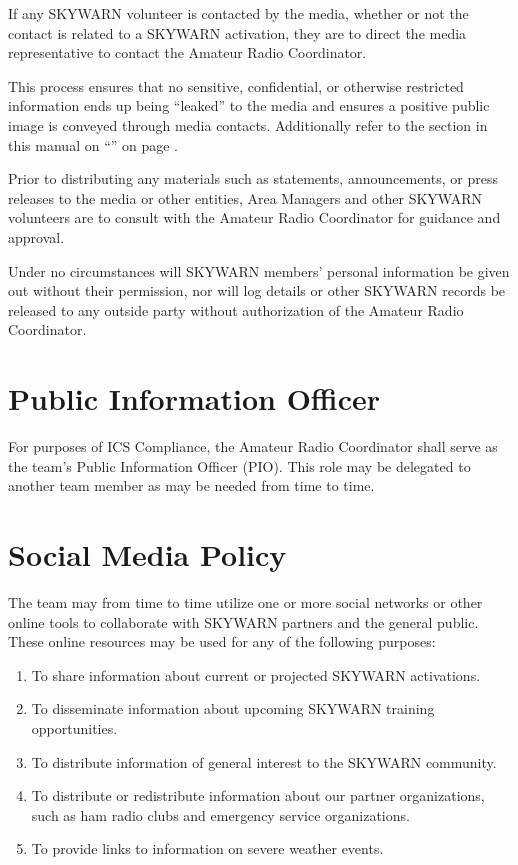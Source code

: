 \documentclass[pdflatex,letterpaper,twoside,12pt]{book}
\begin{document}
If any SKYWARN volunteer is contacted by the media, whether or not the contact is related to a SKYWARN activation, they are to direct the media representative to contact the Amateur Radio Coordinator. 

This process ensures that no sensitive, confidential, or otherwise restricted information ends up being ``leaked'' to the media and ensures a positive public image is conveyed through media contacts.  Additionally refer to the section in this manual on ``'' on page \pageref{handling-sensitive}.

Prior to distributing any materials such as statements, announcements, or press releases to the media or other entities, Area Managers and other SKYWARN volunteers are to consult with the Amateur Radio Coordinator for guidance and approval.

Under no circumstances will SKYWARN members' personal information be given out without their permission, nor will log details or other SKYWARN records be released to any outside party without authorization of the Amateur Radio Coordinator.


\section{Public Information Officer}

For purposes of ICS Compliance, the Amateur Radio Coordinator shall serve as the team's Public Information Officer (PIO).  This role may be delegated to another team member as may be needed from time to time.


\section{Social Media Policy}

The team may from time to time utilize one or more social networks or other online tools to collaborate with SKYWARN partners and the general public.  These online resources may be used for any of the following purposes:

\begin{enumerate}
\item To share information about current or projected SKYWARN activations.
\item To disseminate information about upcoming SKYWARN training opportunities.
\item To distribute information of general interest to the SKYWARN community.
\item To distribute or redistribute information about our partner organizations, such as ham radio clubs and emergency service organizations.
\item To provide links to information on severe weather events.
\end{enumerate}
\end{document}
